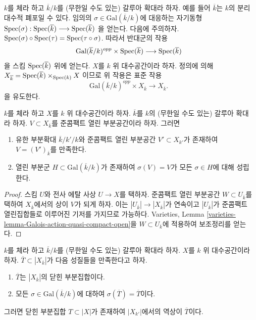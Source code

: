 \noindent
$k$를 체라 하고 $\overline{k}/k$를 (무한일 수도 있는) 갈루아 확대라 하자.
예를 들어 $\overline{k}$는 $k$의 분리 대수적 폐포일 수 있다.
임의의 $\sigma \in \text{Gal}(\overline{k}/k)$에 대응하는 자기동형
$
\mathop{\mathrm{Spec}}(\sigma) :
\mathop{\mathrm{Spec}}(\overline{k})
\longrightarrow
\mathop{\mathrm{Spec}}(\overline{k})
$
을 얻는다. 다음에 주의하자.
$\mathop{\mathrm{Spec}}(\sigma) \circ \mathop{\mathrm{Spec}}(\tau) = \mathop{\mathrm{Spec}}(\tau \circ \sigma)$.
따라서 반대군의 작용
$$
\text{Gal}(\overline{k}/k)^{opp} \times \mathop{\mathrm{Spec}}(\overline{k})
\longrightarrow
\mathop{\mathrm{Spec}}(\overline{k})
$$
을 스킴 $\mathop{\mathrm{Spec}}(\overline{k})$ 위에 얻는다. $X$를 $k$ 위 대수공간이라 하자.
정의에 의해
$X_{\overline{k}} =
\mathop{\mathrm{Spec}}(\overline{k}) \times_{\mathop{\mathrm{Spec}}(k)} X$
이므로 위 작용은 표준 작용
\begin{equation}
\label{equation-galois-action-base-change-kbar}
\text{Gal}(\overline{k}/k)^{opp} \times X_{\overline{k}}
\longrightarrow
X_{\overline{k}}.
\end{equation}
을 유도한다.

\begin{lemma}
\label{lemma-Galois-action-quasi-compact-open}
$k$를 체라 하고 $X$를 $k$ 위 대수공간이라 하자.
$\overline{k}$를 $k$의 (무한일 수도 있는) 갈루아 확대라 하자.
$V \subset X_{\overline{k}}$를 준콤팩트 열린 부분공간이라 하자. 그러면
\begin{enumerate}
\item 유한 부분확대 $\overline{k}/k'/k$와 준콤팩트 열린 부분공간
$V' \subset X_{k'}$가 존재하여 $V = (V')_{\overline{k}}$를 만족한다.
\item 열린 부분군 $H \subset \text{Gal}(\overline{k}/k)$가 존재하여
$\sigma(V) = V$가 모든 $\sigma \in H$에 대해 성립한다.
\end{enumerate}
\end{lemma}

\begin{proof}
스킴 $U$와 전사 에탈 사상 $U \to X$를 택하자.
준콤팩트 열린 부분공간 $W \subset U_{\overline{k}}$를
택하여 $X_{\overline{k}}$에서의 상이 $V$가 되게 하자. 이는
$|U_{\overline{k}}| \to |X_{\overline{k}}|$가 연속이고
$|U_{\overline{k}}|$가 준콤팩트 열린집합들로 이루어진 기저를 가지므로
가능하다. Varieties, Lemma
\ref{varieties-lemma-Galois-action-quasi-compact-open}을
$W \subset U_{\overline{k}}$에 적용하여 보조정리를 얻는다.
\end{proof}

\begin{lemma}
\label{lemma-closed-fixed-by-Galois}
$k$를 체라 하고 $\overline{k}/k$를 (무한일 수도 있는) 갈루아 확대라 하자.
$X$를 $k$ 위 대수공간이라 하자. $\overline{T} \subset |X_{\overline{k}}|$가
다음 성질들을 만족한다고 하자.
\begin{enumerate}
\item $\overline{T}$는 $|X_{\overline{k}}|$의 닫힌 부분집합이다.
\item 모든 $\sigma \in \text{Gal}(\overline{k}/k)$에 대하여
$\sigma(\overline{T}) = \overline{T}$이다.
\end{enumerate}
그러면 닫힌 부분집합 $T \subset |X|$가 존재하여 $|X_{k'}|$에서의 역상이
$\overline{T}$이다.
\end{lemma}

